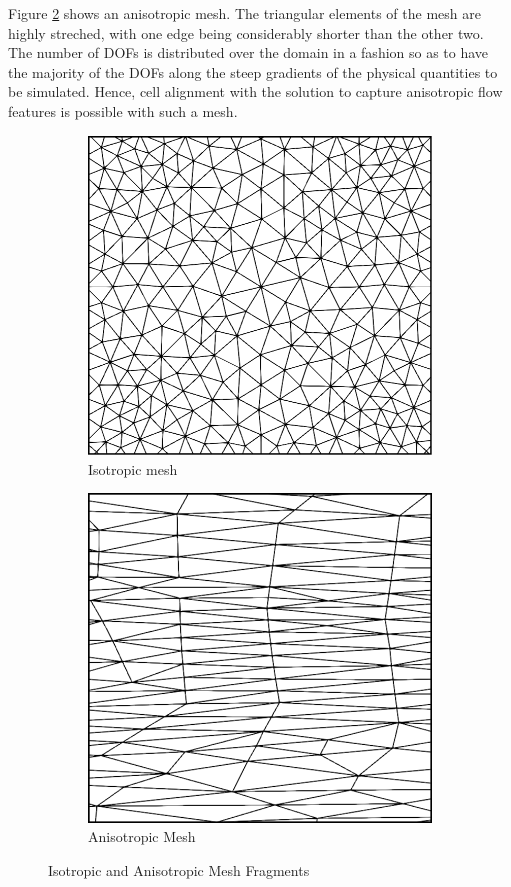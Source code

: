 Figure \ref{fig-anisotropic} shows an anisotropic mesh. The triangular elements of the mesh are highly streched, with one edge being considerably shorter than the other two. The number of DOFs is distributed over the domain in a fashion so as to have the majority of the DOFs along the steep gradients of the physical quantities to be simulated. Hence, cell alignment with the solution to capture anisotropic flow features is possible with such a mesh.

\begin{figure}
	\centering
	\begin{subfigure}{0.5\linewidth}
	  \centering
	  \includegraphics[width=0.9\linewidth]{img/intro/isotropic.png}
	  \caption{Isotropic mesh}
	  \label{fig-isotropic}
	\end{subfigure}%
	\begin{subfigure}{0.5\linewidth}
		\centering
		\includegraphics[width=0.88\linewidth]{img/intro/anisotropic.png}
		\caption{Anisotropic Mesh}
		\label{fig-anisotropic}
	\end{subfigure}
	\caption{Isotropic and Anisotropic Mesh Fragments}
	\label{fig-isotropic-anisotropic}
\end{figure}

